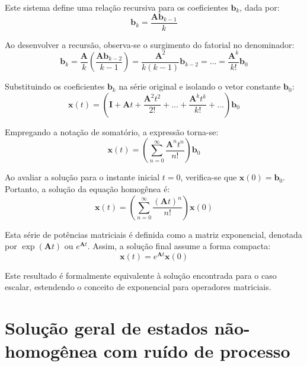 \documentclass[a4paper,12pt]{article}
\begin{document}
Este sistema define uma relação recursiva para os coeficientes $\mathbf{b}_k$, dada por:
\begin{equation}
    \mathbf{b}_k = \frac{\mathbf{A}\mathbf{b}_{k-1}}{k} 
    \label{eq:recEq}
\end{equation}

Ao desenvolver a recursão, observa-se o surgimento do fatorial no denominador:
\begin{equation}
    \mathbf{b}_k = \frac{\mathbf{A}}{k} \left( \frac{\mathbf{A}\mathbf{b}_{k-2}}{k-1} \right) = \frac{\mathbf{A}^2}{k(k-1)} \mathbf{b}_{k-2} = \dots = \frac{\mathbf{A}^k}{k!} \mathbf{b}_0
\end{equation}

Substituindo os coeficientes $\mathbf{b}_k$ na série original e isolando o vetor constante $\mathbf{b}_0$:
\begin{equation}
    \mathbf{x}(t) = \left( \mathbf{I} + \mathbf{A}t + \frac{\mathbf{A}^2 t^2}{2!} + \dots + \frac{\mathbf{A}^k t^k}{k!} + \dots \right) \mathbf{b}_0
\end{equation}

Empregando a notação de somatório, a expressão torna-se:
\begin{equation}
    \mathbf{x}(t) = \left( \sum_{n=0}^{\infty} \frac{\mathbf{A}^n t^n}{n!} \right) \mathbf{b}_0
\end{equation}

Ao avaliar a solução para o instante inicial $t=0$, verifica-se que $\mathbf{x}(0) = \mathbf{b}_0$. Portanto, a solução da equação homogênea é:
\begin{equation}
    \mathbf{x}(t) = \left( \sum_{n=0}^{\infty} \frac{(\mathbf{A}t)^n}{n!} \right) \mathbf{x}(0)
\end{equation}

Esta série de potências matriciais é definida como a matriz exponencial, denotada por $\exp(\mathbf{A}t)$ ou $e^{\mathbf{A}t}$. Assim, a solução final assume a forma compacta:
\begin{equation}
    \mathbf{x}(t) = e^{\mathbf{A}t} \mathbf{x}(0)
\end{equation}

Este resultado é formalmente equivalente à solução encontrada para o caso escalar, estendendo o conceito de exponencial para operadores matriciais.
\newpage
\section{Solução geral de estados não-homogênea com ruído de processo}
\label{anm:solucao_edo_erro}
\end{document}
